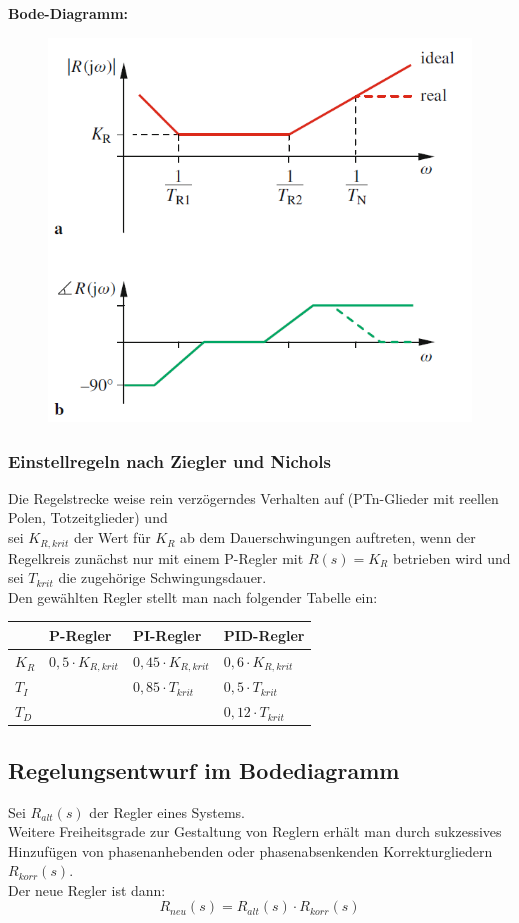 \documentclass[10pt,a4paper]{article}
\begin{document}
\textbf{Bode-Diagramm:}
\begin{figure}[H]
	\includegraphics[width = 0.4\columnwidth]{imgs/pid-regler.png}
\end{figure}

\subsubsection{Einstellregeln nach Ziegler und Nichols}
Die Regelstrecke weise rein verzögerndes Verhalten auf (PTn-Glieder mit reellen Polen, Totzeitglieder) und \\
sei $K_{R,krit}$ der Wert für $K_R$ ab dem Dauerschwingungen auftreten, wenn der Regelkreis zunächst nur mit einem P-Regler mit $R(s) = K_R$ betrieben wird und \\
sei $T_{krit}$ die zugehörige Schwingungsdauer. \\

Den gewählten Regler stellt man nach folgender Tabelle ein: \\

\begin{tabular}{l|lll}
	& P-Regler & PI-Regler & PID-Regler \\
	\hline
	$K_R$ & $0,5 ⋅ K_{R,krit}$ & $0,45 ⋅ K_{R,krit}$ & $0,6 ⋅ K_{R,krit}$ \\
	$T_I$ & & $0,85 ⋅ T_{krit}$ & $0,5 ⋅ T_{krit}$ \\
	$T_D$ & & & $0,12 ⋅ T_{krit}$
\end{tabular}

\subsection{Regelungsentwurf im Bodediagramm}
Sei $R_{alt}(s)$ der Regler eines Systems. \\
Weitere Freiheitsgrade zur Gestaltung von Reglern erhält man durch sukzessives Hinzufügen von phasenanhebenden oder phasenabsenkenden Korrekturgliedern $R_{korr}(s)$. \\
Der neue Regler ist dann:
$$
R_{neu}(s) = R_{alt}(s) ⋅ R_{korr}(s)
$$
\end{document}
